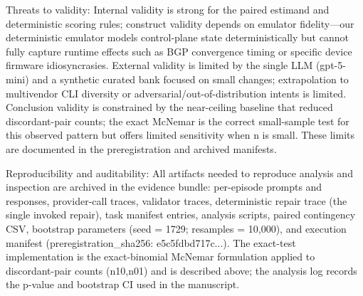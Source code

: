 \documentclass[conference]{IEEEtran}
\begin{document}
Threats to validity: Internal validity is strong for the paired estimand and deterministic scoring rules; construct validity depends on emulator fidelity---our deterministic emulator models control-plane state deterministically but cannot fully capture runtime effects such as BGP convergence timing or specific device firmware idiosyncrasies. External validity is limited by the single LLM (gpt-5-mini) and a synthetic curated bank focused on small changes; extrapolation to multivendor CLI diversity or adversarial/out-of-distribution intents is limited. Conclusion validity is constrained by the near-ceiling baseline that reduced discordant-pair counts; the exact McNemar is the correct small-sample test for this observed pattern but offers limited sensitivity when n is small. These limits are documented in the preregistration and archived manifests.

Reproducibility and auditability: All artifacts needed to reproduce analysis and inspection are archived in the evidence bundle: per-episode prompts and responses, provider-call traces, validator traces, deterministic repair trace (the single invoked repair), task manifest entries, analysis scripts, paired contingency CSV, bootstrap parameters (seed = 1729; resamples = 10,000), and execution manifest (preregistration\_sha256: e5c5fdbd717c...). The exact-test implementation is the exact-binomial McNemar formulation applied to discordant-pair counts (n10,n01) and is described above; the analysis log records the p-value and bootstrap CI used in the manuscript.
\end{document}
